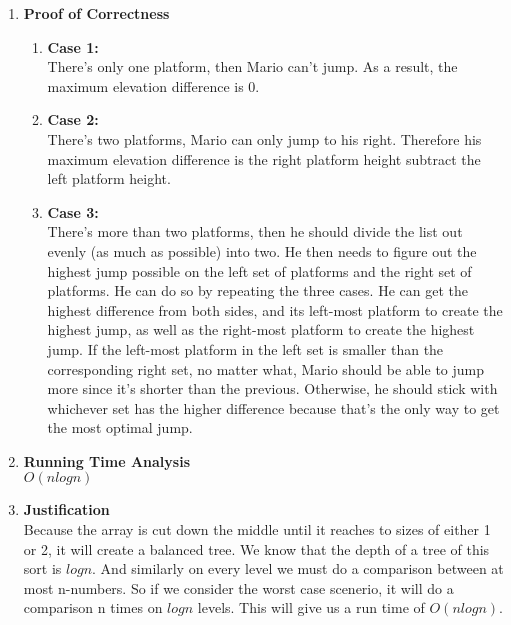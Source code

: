 \documentclass[11pt]{article}
\newenvironment{qparts}{\begin{enumerate}[{(}a{)}]}{\end{enumerate}}
\begin{document}
\begin{qparts}
	\item[] \textbf{Proof of Correctness} 
	\begin{qparts}
		\item[] \textbf{Case 1:} \\
		There's only one platform, then Mario can't jump. As a result, the maximum elevation difference is 0. 
		\item[] \textbf{Case 2:} \\
		There's two platforms, Mario can only jump to his right. Therefore his maximum elevation difference is the right platform height subtract the left platform height. 
		\item[] \textbf{Case 3:} \\
		There's more than two platforms, then he should divide the list out evenly (as much as possible) into two. He then needs to figure out the highest jump possible on the left set of platforms and the right set of platforms. He can do so by repeating the three cases. He can get the highest difference from both sides, and its left-most platform to create the highest jump, as well as the right-most platform to create the highest jump. If the left-most platform in the left set is smaller than the corresponding right set, no matter what, Mario should be able to jump more since it's shorter than the previous. Otherwise, he should stick with whichever set has the higher difference because that's the only way to get the most optimal jump. 
	\end{qparts}


	\item[] \textbf{Running Time Analysis} \\
	$O(nlogn)$
	\item[] \textbf{Justification} \\
	Because the array is cut down the middle until it reaches to sizes of either 1 or 2, it will create a balanced tree. We know that the depth of a tree of this sort is $logn$. And similarly on every level we must do a comparison between at most n-numbers. So if we consider the worst case scenerio, it will do a comparison n times on $logn$ levels. This will give us a run time of $O(nlogn)$.
\end{qparts}
\end{document}
